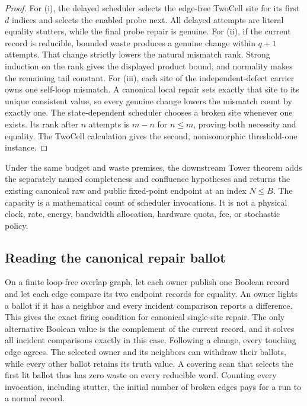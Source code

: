 \documentclass[11pt]{article}
\theoremstyle{definition}
\theoremstyle{remark}
\numberwithin{equation}{section}
\begin{document}
\begin{proof}
For (i), the delayed scheduler selects the edge-free TwoCell site for its
first \(d\) indices and selects the enabled probe next.  All delayed attempts
are literal equality stutters, while the final probe repair is genuine.
For (ii), if the current record is reducible, bounded waste produces a genuine
change within \(q+1\) attempts.  That change strictly lowers the natural
mismatch rank.  Strong induction on the rank gives the displayed product
bound, and normality makes the remaining tail constant.  For (iii), each site
of the independent-defect carrier owns one self-loop mismatch.  A canonical
local repair sets exactly that site to its unique consistent value, so every
genuine change lowers the mismatch count by exactly one.  The state-dependent
scheduler chooses a broken site whenever one exists.  Its rank after \(n\)
attempts is \(m-n\) for \(n\le m\), proving both necessity and equality.  The
TwoCell calculation gives the second, nonisomorphic threshold-one instance.
\end{proof}

Under the same budget and waste premises, the downstream Tower theorem adds
the separately named completeness and confluence hypotheses and returns the
existing canonical raw and public fixed-point endpoint at an index
\(N\le B\).  The capacity is a mathematical count of scheduler invocations.
It is not a physical clock, rate, energy, bandwidth allocation, hardware
quota, fee, or stochastic policy.

\subsection{Reading the canonical repair ballot}

On a finite loop-free overlap graph, let each owner publish one Boolean record
and let each edge compare its two endpoint records for equality. An owner
lights a ballot if it has a neighbor and every incident comparison reports a
difference. This gives the exact firing condition for canonical single-site
repair. The only alternative Boolean value is the complement of the current
record, and it solves all incident comparisons exactly in this case.
Following a change, every touching edge agrees. The selected owner and its
neighbors can withdraw their ballots, while every other ballot retains its
truth value. A covering scan that selects the first lit ballot thus has zero
waste on every reducible word. Counting every invocation, including stutter,
the initial number of broken edges pays for a run to a normal record.
\end{document}
